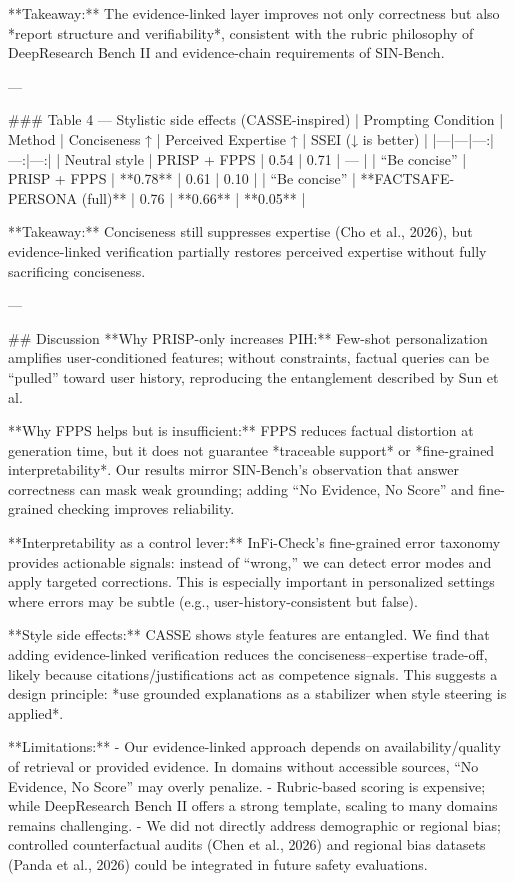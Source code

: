 **Takeaway:** The evidence-linked layer improves not only correctness but also *report structure and verifiability*, consistent with the rubric philosophy of DeepResearch Bench II and evidence-chain requirements of SIN-Bench.

---

### Table 4 — Stylistic side effects (CASSE-inspired)  
| Prompting Condition | Method | Conciseness ↑ | Perceived Expertise ↑ | SSEI (↓ is better) |
|---|---|---:|---:|---:|
| Neutral style | PRISP + FPPS | 0.54 | 0.71 | — |
| “Be concise” | PRISP + FPPS | **0.78** | 0.61 | 0.10 |
| “Be concise” | **FACTSAFE-PERSONA (full)** | 0.76 | **0.66** | **0.05** |

**Takeaway:** Conciseness still suppresses expertise (Cho et al., 2026), but evidence-linked verification partially restores perceived expertise without fully sacrificing conciseness.

---

## Discussion  
**Why PRISP-only increases PIH:** Few-shot personalization amplifies user-conditioned features; without constraints, factual queries can be “pulled” toward user history, reproducing the entanglement described by Sun et al.  

**Why FPPS helps but is insufficient:** FPPS reduces factual distortion at generation time, but it does not guarantee *traceable support* or *fine-grained interpretability*. Our results mirror SIN-Bench’s observation that answer correctness can mask weak grounding; adding “No Evidence, No Score” and fine-grained checking improves reliability.

**Interpretability as a control lever:** InFi-Check’s fine-grained error taxonomy provides actionable signals: instead of “wrong,” we can detect error modes and apply targeted corrections. This is especially important in personalized settings where errors may be subtle (e.g., user-history-consistent but false).

**Style side effects:** CASSE shows style features are entangled. We find that adding evidence-linked verification reduces the conciseness–expertise trade-off, likely because citations/justifications act as competence signals. This suggests a design principle: *use grounded explanations as a stabilizer when style steering is applied*.

**Limitations:**  
- Our evidence-linked approach depends on availability/quality of retrieval or provided evidence. In domains without accessible sources, “No Evidence, No Score” may overly penalize.  
- Rubric-based scoring is expensive; while DeepResearch Bench II offers a strong template, scaling to many domains remains challenging.  
- We did not directly address demographic or regional bias; controlled counterfactual audits (Chen et al., 2026) and regional bias datasets (Panda et al., 2026) could be integrated in future safety evaluations.

